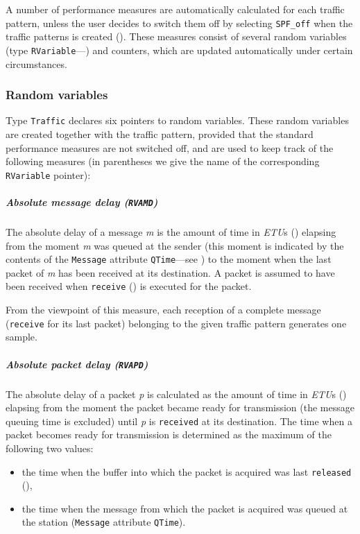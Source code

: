 A number of performance measures are automatically calculated for each
traffic pattern, unless the user decides to switch them off
by selecting {\tt SPF\_off} when the traffic patterns is created
().
These measures consist of several random variables
(type {\tt RVariable}---) and counters, which
are updated automatically under certain circumstances.

\subsubsection{Random variables}
\label{rm_pm_cl_cv}

Type {\tt Traffic} declares six pointers to random variables.
These random variables are created together with the
traffic pattern, provided that the standard performance measures are
not switched off, and are used to keep track of the following measures
(in parentheses we give the name of the corresponding {\tt RVariable}
pointer):

\subparagraph*{Absolute message delay ({\tt RVAMD})}

The absolute delay of a message {\em m\/} is the amount of time
in {\em ETU\/}s ()
elapsing from the moment
{\em m\/} was queued at the sender (this moment is indicated by the contents of the
{\tt Message} attribute {\tt QTime}---see
) to the moment when the last packet of {\em m\/} has been
received at its destination.
A packet is assumed to have been received when {\tt receive} ()
is executed for the packet.

From the viewpoint of this measure, each reception of a complete message
({\tt receive} for its last packet)
belonging to the given traffic pattern
generates one sample.

\subparagraph*{Absolute packet delay ({\tt RVAPD})}

The absolute delay of a packet {\em p\/} is calculated as the amount of time
in {\em ETU\/}s ()
elapsing from the moment the packet became ready for transmission (the message
queuing time is excluded) until {\em p\/} is {\tt received} at its
destination.
The time when a packet becomes ready for transmission
is determined as the maximum of the following two values:
\begin{itemize}
\item
the time when the buffer into which the packet is acquired was
last {\tt released}
(),
\item
the time when the message from which the packet is acquired was queued at the
station ({\tt Message} attribute {\tt QTime}).
\end{itemize}

